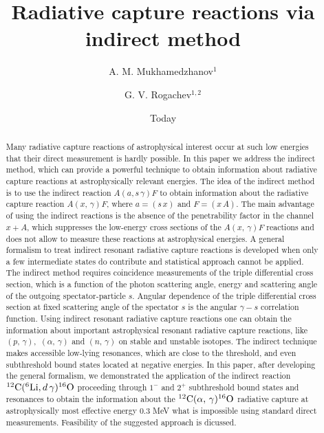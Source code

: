 \documentclass[prl,unsortedaddress,groupedaddress,twocolumn,amsmath,amsfonts,amssymb,showpacs,floatfix,nofootinbib]{revtex4}
\begin{document}
\title{Radiative capture  reactions via indirect method}
\author{A. M. Mukhamedzhanov$^{1}$}
\author{G. V. Rogachev$^{1,2}$}

\date{Today}


\begin{abstract}
Many radiative capture reactions of astrophysical interest occur at such low energies that their direct measurement is hardly possible. In this paper we address the indirect method, which can provide a powerful technique to obtain information about radiative capture reactions at astrophysically relevant energies. The idea of the indirect method is to use the indirect reaction $A(a, s\,\gamma)F$ to obtain information about the radiative capture reaction $A(x,\,\gamma)F$, where $a=(s\,x)$ and $F=(x\,A)$. The main advantage of using the indirect reactions is the absence of the penetrability factor in the channel $x+A$, which suppresses the low-energy cross sections of the  $A(x,\,\gamma)F$ reactions and does not allow to measure these reactions at astrophysical energies. A general formalism to treat indirect resonant radiative capture reactions is developed when only a few intermediate states do contribute and statistical approach cannot be applied. The indirect method requires coincidence measurements of the triple differential cross section, which is a function of the photon scattering angle, energy  and scattering angle of the outgoing spectator-particle $s$. 
Angular dependence of the triple differential cross section at fixed scattering angle of the spectator $s$ is the angular $\gamma-s$ correlation function.
Using indirect resonant radiative capture reactions one can obtain the information about important astrophysical resonant radiative capture reactions, like $(p,\,\gamma), \,\,(\alpha,\,\gamma)$ and $(n,\,\gamma)$ on stable and unstable isotopes. The indirect technique makes accessible low-lying resonances, which are close to the threshold, and even subthreshold bound states located at negative energies. 
In this paper, after developing the general formalism, we demonstrated the application of the  indirect reaction ${}^{12}{\rm C}({}^{6}{\rm Li},d\,\gamma){}^{16}{\rm O}$ proceeding through $1^{-}$ and $2^{+}$ subthreshold bound states and resonances to obtain the information about the ${}^{12}{\rm C}(\alpha,\,\gamma){}^{16}{\rm O}$ radiative capture at astrophysically most effective energy $0.3$ MeV what is impossible using standard direct measurements. Feasibility of the suggested approach is dicussed.
\end{abstract}
\end{document}
